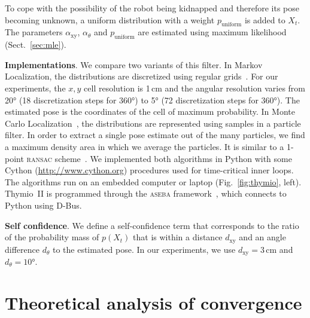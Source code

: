 \documentclass{svmult}
\newcommand{\fig}[1]{Fig.~\ref{fig:#1}}
\newcommand{\sect}[1]{Sect.~\ref{sec:#1}}
\begin{document}
To cope with the possibility of the robot being kidnapped and therefore its pose becoming unknown, a uniform distribution with a weight $p_\mathrm{uniform}$ is added to $X_t$.
The parameters $\alpha_\mathrm{xy}$, $\alpha_\theta$ and $p_\mathrm{uniform}$ are estimated using maximum likelihood (\sect{mle}).


\textbf{Implementations}.
We compare two variants of this filter.
In Markov Localization, the distributions are discretized using regular grids~\cite{fox1999markov}.
For our experiments, the $x,y$ cell resolution is 1\,cm and the angular resolution varies from 20° (18 discretization steps for 360°) to 5° (72 discretization steps for 360°).
The estimated pose is the coordinates of the cell of maximum probability.
In Monte Carlo Localization~\cite{dellaert1999monte}, the distributions are represented using samples in a particle filter.
In order to extract a single pose estimate out of the many particles, we find a maximum density area in which we average the particles.
It is similar to a 1-point \textsc{ransac} scheme~\cite{Fischler1981ransac}.
We implemented both algorithms in Python with some Cython (\url{http://www.cython.org}) procedures used for time-critical inner loops.
The algorithms run on an embedded computer or laptop (\fig{thymio}, left).
Thymio~II is programmed through the \textsc{aseba} framework~\cite{aseba2011tmech}, which connects to Python using D-Bus.


\textbf{Self confidence}. We define a self-confidence term that corresponds to the ratio of the probability mass of $p(X_t)$ that is within a distance $d_\mathrm{xy}$ and an angle difference $d_\theta$ to the estimated pose.
In our experiments, we use $d_\mathrm{xy} = 3$\,cm and $d_\theta = 10$°.

\section{Theoretical analysis of convergence}
\label{sec:theoreticalconv}
\end{document}
